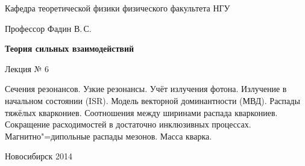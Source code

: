 \documentclass[12pt,pagesize,paper=landscape,paper=192mm:108mm]{scrbook}
\begin{document}
\begin{titlepage}
\begin{center}
    Кафедра теоретической физики физического факультета НГУ
    \medskip

    \Large
    Профессор Фадин В.\,С.

    \huge
    \textbf{Теория сильных взаимодействий}
    \smallskip
    
    \Large
    Лекция № 6
    \vfill
    
    \normalsize
    \begin{minipage}{0.7\linewidth}
      Сечения резонансов. Узкие резонансы. Учёт излучения
      фотона. Излучение в начальном состоянии (ISR). Модель векторной
      доминантности (МВД). Распады тяжёлых кваркониев. Соотношения
      между ширинами распада кваркониев. Сокращение расходимостей в
      достаточно инклюзивных процессах. Магнитно"=дипольные распады
      мезонов. Масса кварка.
    \end{minipage}
    \vfill
    
    \normalsize \ccbysa\hspace{0.5em}  Новосибирск 2014   
  \end{center}
\end{titlepage}
\end{document}
